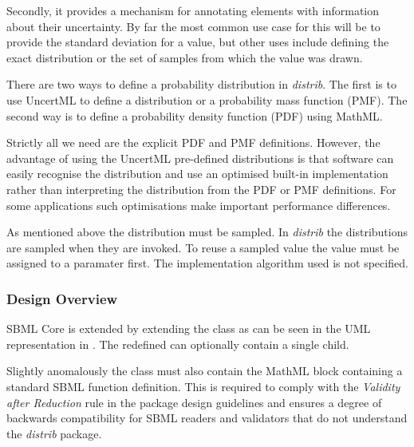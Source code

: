 \documentclass[draftspec]{sbmlpkgspec}
\newcommand{\distribshort}{\emph{distrib}\xspace}
\newcommand{\mathml}{MathML\xspace}
\begin{document}
Secondly, it provides a mechanism for annotating elements with information about their uncertainty.  By far the most common use case for this will be to provide the standard deviation for a value, but other uses include defining the exact distribution or the set of samples from which the value was drawn.

There are two ways to define a probability distribution in
\distribshort. The first is to use UncertML to define a distribution
or a probability mass function (PMF).  The second way is to define
a probability density function (PDF) using MathML.

Strictly all we need are the explicit PDF and PMF
definitions. However, the advantage of using the UncertML pre-defined
distributions is that software can easily recognise the distribution
and use an optimised built-in implementation rather than interpreting
the distribution from the PDF or PMF definitions. For some
applications such optimisations make important performance
differences.

As mentioned above the distribution must be sampled. In \distribshort
the distributions are sampled when they are invoked. To reuse a
sampled value the value must be assigned to a paramater first. The
implementation algorithm used is not specified.

\subsubsection{Design Overview}

SBML Core is extended by extending the \FunctionDefinition class as
can be seen in the UML representation in . The redefined \FunctionDefinition can optionally
contain a single  child.

Slightly anomalously the \FunctionDefinition class must also contain the
\mathml block containing a standard SBML function definition. This is
required to comply with the \emph{Validity after Reduction} rule in the
package design guidelines \cite{sbmll3v1packrule} and ensures a degree
of backwards compatibility for SBML readers and validators that do not
understand the \distribshort package.
\end{document}
